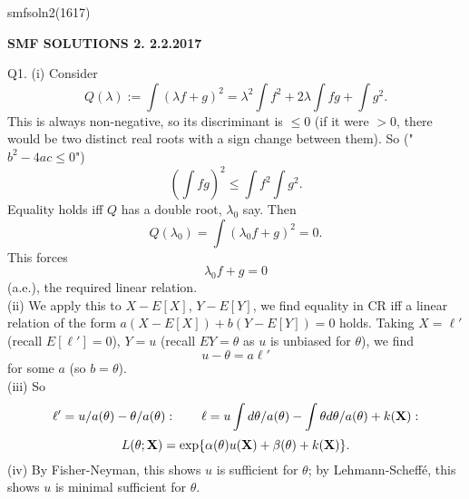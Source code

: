 \documentclass[12pt]{article}
\begin{document}
\def\R{\mathbb{R}}
\def\C{\mathbb{C}}
\def\Z{\mathbb{Z}}
\def\N{\mathbb{N}}
\def\Q{\mathbb{Q}}
\def\D{\mathbb{D}}
\def\T{\mathbb{T}}
\def\hb{\hfil \break}
\def\ni{\noindent}
\def\i{\indent}
\def\a{\alpha}
\def\b{\beta}
\def\e{\epsilon}
\def\d{\delta}
\def\De{\Delta}
\def\g{\gamma}
\def\qq{\qquad}
\def\L{\Lambda}
\def\E{\cal E}
\def\G{\Gamma}
\def\F{\cal F}
\def\K{\cal K}
\def\A{\cal A}
\def\B{\cal B}
\def\M{\cal M}
\def\P{\cal P}
\def\Om{\Omega}
\def\om{\omega}
\def\s{\sigma}
\def\t{\theta}
\def\th{\theta}
\def\Th{\Theta}
\def\z{\zeta}
\def\p{\phi}
\def\m{\mu}
\def\n{\nu}
\def\l{\lambda}
\def\Si{\Sigma}
\def\q{\quad}
\def\qq{\qquad}
\def\half{\frac{1}{2}}
\def\hb{\hfil \break}
\def\half{\frac{1}{2}}
\def\pa{\partial}
\def\r{\rho}
\def\hb{\hfil \break}
\def\ni{\noindent}
\def\i{\indent}
\ni smfsoln2(1617)\\
\begin{center}
{\bf SMF SOLUTIONS 2. 2.2.2017}
\end{center}

\ni Q1.  (i) Consider
$$
Q(\l) := \int (\l f + g)^2 = {\l}^2 \int f^2 + 2 \l \int fg + \int g^2.
$$
This is always non-negative, so its discriminant is $\leq 0$ (if it were $> 0$, there would be two distinct real roots with a sign change between them).  So ("$b^2 - 4ac \leq 0$")
$$
(\int fg)^2 \leq \int f^2 \int g^2.
$$
Equality holds iff $Q$ has a double root, ${\l}_0$ say.  Then
$$
Q({\l}_0) = \int ({\l}_0 f + g)^2 = 0.
$$
This forces
$$
{\l}_0 f + g = 0
$$
(a.e.), the required linear relation. \\
(ii) We apply this to $X - E[X]$, $Y - E[Y]$, we find equality in CR iff a linear relation of the form $a(X - E[X]) + b(Y - E[Y]) = 0$ holds.  Taking $X = {\ell}'$ (recall $E[{\ell}'] = 0$), $Y = u$ (recall $EY = \t$ as $u$ is unbiased for $\t$), we find
$$
u - \t = a {\ell}'
$$
for some $a$ (so $b = \t$). \\
(iii) So
$$
{\ell}' = u/a(\t) - \t/a(\t): \qquad \ell = u \int d\t/a(\t) - \int \t d\t/a(\t) + k({\bf X}):
$$
$$
L(\t; {\bf X}) = \exp \{ \a(\t) u({\bf X}) + \b(\t) + k({\bf X}) \}.
$$
(iv) By Fisher-Neyman, this shows $u$ is sufficient for $\t$; by Lehmann-Scheff\'e, this shows $u$ is minimal sufficient for $\t$. \\
\end{document}

